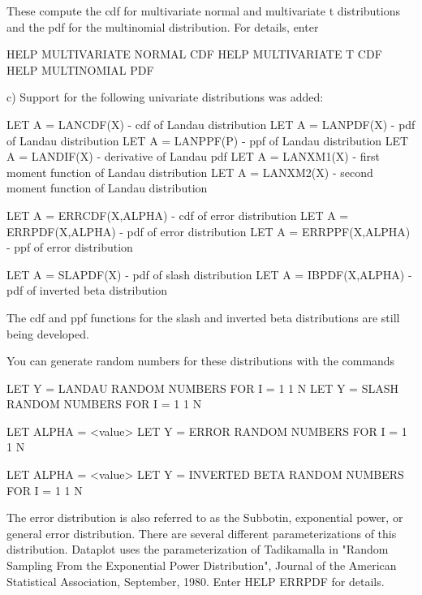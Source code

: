 {        These compute the cdf for multivariate normal and
        multivariate t distributions and the pdf for the multinomial
        distribution.  For details, enter

           HELP MULTIVARIATE NORMAL CDF
           HELP MULTIVARIATE T CDF
           HELP MULTINOMIAL PDF
           
     c) Support for the following univariate distributions was
        added:

           LET A = LANCDF(X)       - cdf of Landau distribution
           LET A = LANPDF(X)       - pdf of Landau distribution
           LET A = LANPPF(P)       - ppf of Landau distribution
           LET A = LANDIF(X)       - derivative of Landau pdf
           LET A = LANXM1(X)       - first moment function of
                                     Landau distribution
           LET A = LANXM2(X)       - second moment function of
                                     Landau distribution

           LET A = ERRCDF(X,ALPHA) - cdf of error distribution
           LET A = ERRPDF(X,ALPHA) - pdf of error distribution
           LET A = ERRPPF(X,ALPHA) - ppf of error distribution

           LET A = SLAPDF(X)       - pdf of slash distribution
           LET A = IBPDF(X,ALPHA)  - pdf of inverted beta distribution

        The cdf and ppf functions for the slash and inverted
        beta distributions are still being developed.

        You can generate random numbers for these distributions
        with the commands

           LET Y = LANDAU RANDOM NUMBERS FOR I = 1 1 N
           LET Y = SLASH RANDOM NUMBERS FOR I = 1 1 N

           LET ALPHA = <value>
           LET Y = ERROR RANDOM NUMBERS FOR I = 1 1 N

           LET ALPHA = <value>
           LET Y = INVERTED BETA RANDOM NUMBERS FOR I = 1 1 N

        The error distribution is also referred to as the
        Subbotin, exponential power, or general error distribution.
        There are several different parameterizations of this
        distribution.  Dataplot uses the parameterization of
        Tadikamalla in "Random Sampling From the Exponential
        Power Distribution", Journal of the American Statistical
        Association, September, 1980.  Enter HELP ERRPDF for
        details.

}
